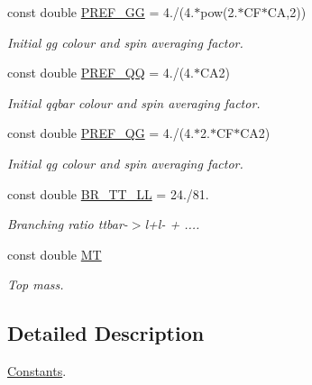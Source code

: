 \begin{DoxyCompactItemize}
\item 
\hypertarget{namespaceConstants_a86300d39a41e924fc25d986be2e42de1}{const double \hyperlink{namespaceConstants_a86300d39a41e924fc25d986be2e42de1}{P\-R\-E\-F\-\_\-\-G\-G} = 4./(4.$\ast$pow(2.$\ast$C\-F$\ast$C\-A,2))}\label{namespaceConstants_a86300d39a41e924fc25d986be2e42de1}

\begin{DoxyCompactList}\small\item\em Initial gg colour and spin averaging factor. \end{DoxyCompactList}\item 
\hypertarget{namespaceConstants_a1f51674d250f71ebde34af46ff997504}{const double \hyperlink{namespaceConstants_a1f51674d250f71ebde34af46ff997504}{P\-R\-E\-F\-\_\-\-Q\-Q} = 4./(4.$\ast$C\-A2)}\label{namespaceConstants_a1f51674d250f71ebde34af46ff997504}

\begin{DoxyCompactList}\small\item\em Initial qqbar colour and spin averaging factor. \end{DoxyCompactList}\item 
\hypertarget{namespaceConstants_a51ed5e005486d4e9af1c3a84eb3be1ba}{const double \hyperlink{namespaceConstants_a51ed5e005486d4e9af1c3a84eb3be1ba}{P\-R\-E\-F\-\_\-\-Q\-G} = 4./(4.$\ast$2.$\ast$C\-F$\ast$C\-A2)}\label{namespaceConstants_a51ed5e005486d4e9af1c3a84eb3be1ba}

\begin{DoxyCompactList}\small\item\em Initial qg colour and spin averaging factor. \end{DoxyCompactList}\item 
\hypertarget{namespaceConstants_a08dd306759548b9ee421fca4602579e2}{const double \hyperlink{namespaceConstants_a08dd306759548b9ee421fca4602579e2}{B\-R\-\_\-\-T\-T\-\_\-\-L\-L} = 24./81.}\label{namespaceConstants_a08dd306759548b9ee421fca4602579e2}

\begin{DoxyCompactList}\small\item\em Branching ratio ttbar-\/$>$l+l-\/ + .... \end{DoxyCompactList}\item 
\hypertarget{namespaceConstants_ab9f84b1266addc2e5cba752c68f56a51}{const double \hyperlink{namespaceConstants_ab9f84b1266addc2e5cba752c68f56a51}{M\-T}}\label{namespaceConstants_ab9f84b1266addc2e5cba752c68f56a51}

\begin{DoxyCompactList}\small\item\em Top mass. \end{DoxyCompactList}\end{DoxyCompactItemize}


\subsection{Detailed Description}
\hyperlink{namespaceConstants}{Constants}. 